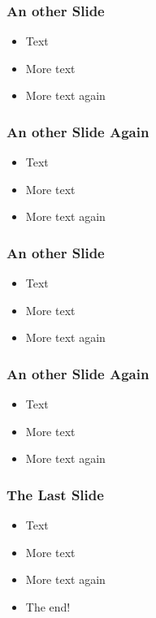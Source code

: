 
\begin{frame} 
\frametitle{An other Slide}
  \begin{itemize}
  \item Text
  \item More text
  \item More text again
  \end{itemize}
\end{frame}


\begin{frame} 
\frametitle{An other Slide Again}
  \begin{itemize}
  \item Text
  \item More text
  \item More text again
  \end{itemize}
\end{frame}


\begin{frame} 
\frametitle{An other Slide}
  \begin{itemize}
  \item Text
  \item More text
  \item More text again
  \end{itemize}
\end{frame}


\begin{frame} 
\frametitle{An other Slide Again}
  \begin{itemize}
  \item Text
  \item More text
  \item More text again
  \end{itemize}
\end{frame}


\begin{frame} 
\frametitle{The Last Slide}
  \begin{itemize}
  \item Text
  \item More text
  \item More text again
  \item The end!
  \end{itemize}
\end{frame}



